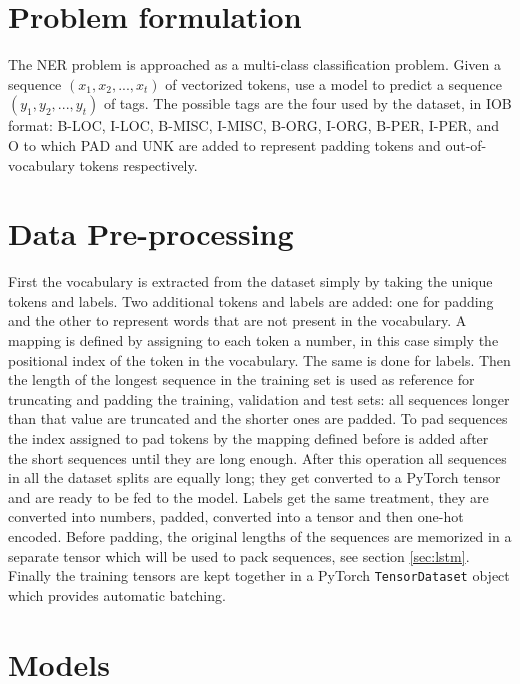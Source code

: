 \documentclass[journal]{IEEEtran}
\begin{document}
\section{Problem formulation}
The NER problem is approached as a multi-class classification problem. Given a sequence $(x_1, x_2, ..., x_t)$ of vectorized tokens, use a model to predict a sequence $(y_1, y_2, ..., y_t)$ of tags. The possible tags are the four used by the dataset, in IOB format: B-LOC, I-LOC, B-MISC, I-MISC, B-ORG, I-ORG, B-PER, I-PER, and O to which PAD and UNK are added to represent padding tokens and out-of-vocabulary tokens respectively.


\section{Data Pre-processing}
First the vocabulary is extracted from the dataset simply by taking the unique tokens and labels. Two additional tokens and labels are added: one for padding and the other to represent words that are not present in the vocabulary.
A mapping is defined by assigning to each token a number, in this case simply the positional index of the token in the vocabulary. The same is done for labels. Then the length of the longest sequence in the training set is used as reference for truncating and padding the training, validation and test sets: all sequences longer than that value are truncated and the shorter ones are padded. To pad sequences the index assigned to pad tokens by the mapping defined before is added after the short sequences until they are long enough. After this operation all sequences in all the dataset splits are equally long; they get converted to a PyTorch tensor and are ready to be fed to the model.
Labels get the same treatment, they are converted into numbers, padded, converted into a tensor and then one-hot encoded.
Before padding, the original lengths of the sequences are memorized in a separate tensor which will be used to pack sequences, see section \ref{sec:lstm}.
Finally the training tensors are kept together in a PyTorch \texttt{TensorDataset} object which provides automatic batching.


\section{Models}
\end{document}
